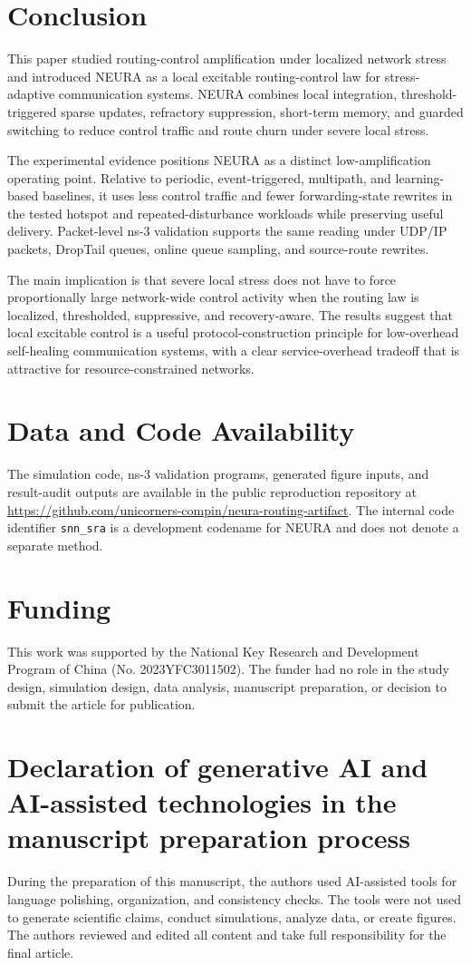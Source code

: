 \documentclass[5p,times]{elsarticle}
\begin{document}
\section{Conclusion}
This paper studied routing-control amplification under localized network stress and introduced NEURA as a local excitable routing-control law for stress-adaptive communication systems. NEURA combines local integration, threshold-triggered sparse updates, refractory suppression, short-term memory, and guarded switching to reduce control traffic and route churn under severe local stress.

The experimental evidence positions NEURA as a distinct low-amplification operating point. Relative to periodic, event-triggered, multipath, and learning-based baselines, it uses less control traffic and fewer forwarding-state rewrites in the tested hotspot and repeated-disturbance workloads while preserving useful delivery. Packet-level ns-3 validation supports the same reading under UDP/IP packets, DropTail queues, online queue sampling, and source-route rewrites.

The main implication is that severe local stress does not have to force proportionally large network-wide control activity when the routing law is localized, thresholded, suppressive, and recovery-aware. The results suggest that local excitable control is a useful protocol-construction principle for low-overhead self-healing communication systems, with a clear service-overhead tradeoff that is attractive for resource-constrained networks.

\section*{Data and Code Availability}
The simulation code, ns-3 validation programs, generated figure inputs, and result-audit outputs are available in the public reproduction repository at \url{https://github.com/unicorners-compin/neura-routing-artifact}. The internal code identifier \texttt{snn\_sra} is a development codename for NEURA and does not denote a separate method.

\section*{Funding}
This work was supported by the National Key Research and Development Program of China (No. 2023YFC3011502). The funder had no role in the study design, simulation design, data analysis, manuscript preparation, or decision to submit the article for publication.

\section*{Declaration of generative AI and AI-assisted technologies in the manuscript preparation process}
During the preparation of this manuscript, the authors used AI-assisted tools for language polishing, organization, and consistency checks. The tools were not used to generate scientific claims, conduct simulations, analyze data, or create figures. The authors reviewed and edited all content and take full responsibility for the final article.


\end{document}
